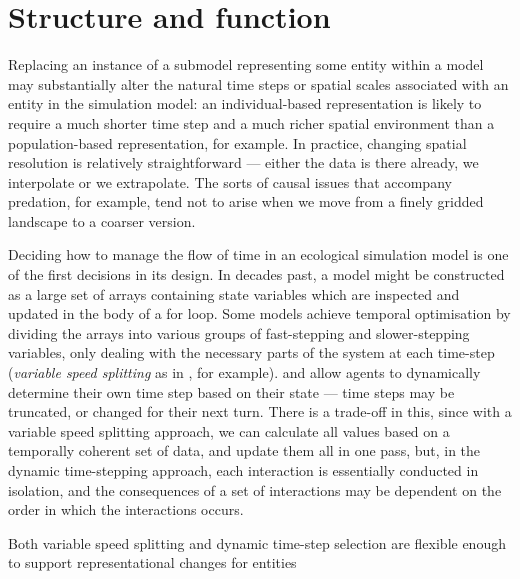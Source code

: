 \section{Structure and function}

Replacing an instance of a submodel representing some entity within a
model may substantially alter the natural time steps or spatial scales
associated with an entity in the simulation model: an individual-based
representation is likely to require a much shorter time step and a much
richer spatial environment than a population-based representation, for
example.  In practice, changing spatial resolution is relatively
straightforward --- either the data is there already, we interpolate
or we extrapolate. The sorts of causal issues that accompany
predation, for example, tend not to arise when we move from a finely
gridded landscape to a coarser version.

Deciding how to manage the flow of time in an ecological simulation
model is one of the first decisions in its design.  In decades past, a
model might be constructed as a large set of arrays containing state
variables which are inspected and updated in the body of a for
loop. Some models achieve temporal optimisation by dividing the arrays
into various groups of fast-stepping and slower-stepping variables,
only dealing with the necessary parts of the system at each time-step
(\emph{variable speed splitting} as in \cite{walters2000ecosystem},
for example). \cite{Gray06:1} and \cite{Gray2014} allow agents to
dynamically determine their own time step based on their state ---
time steps may be truncated, or changed for their next turn. There is a
trade-off in this, since with a variable speed splitting approach, we
can calculate all values based on a temporally coherent set of data,
and update them all in one pass, but, in the dynamic time-stepping
approach, each interaction is essentially conducted in isolation, and
the consequences of a set of interactions may be dependent on the
order in which the interactions occurs.

Both variable speed splitting and dynamic time-step selection are
flexible enough to support representational changes for entities









